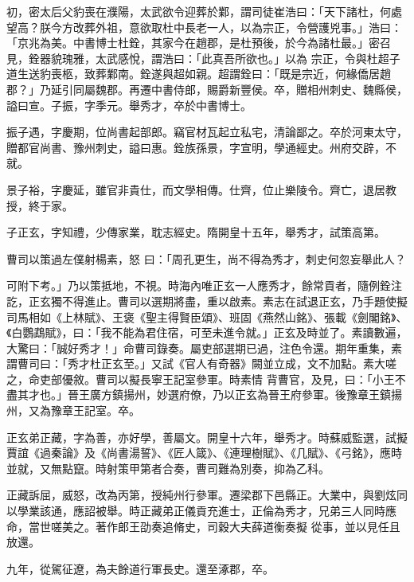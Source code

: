 \begin{pinyinscope}
 初，密太后父豹喪在濮陽，太武欲令迎葬於鄴，謂司徒崔浩曰：「天下諸杜，何處望高？朕今方改葬外祖，意欲取杜中長老一人，以為宗正，令營護兇事。」浩曰：「京兆為美。中書博士杜銓，其家今在趙郡，是杜預後，於今為諸杜最。」密召見，銓器貌瑰雅，太武感悅，謂浩曰：「此真吾所欲也。」以為
 宗正，令與杜超子道生送豹喪柩，致葬鄴南。銓遂與超如親。超謂銓曰：「既是宗近，何緣僑居趙郡？」乃延引同屬魏郡。再遷中書侍郎，賜爵新豐侯。卒，贈相州刺史、魏縣侯，謚曰宣。子振，字季元。舉秀才，卒於中書博士。



 振子遇，字慶期，位尚書起部郎。竊官材瓦起立私宅，清論鄙之。卒於河東太守，贈都官尚書、豫州刺史，謚曰惠。銓族孫景，字宣明，學通經史。州府交辟，不就。



 景子裕，字慶延，雖官非貴仕，而文學相傳。仕齊，位止樂陵令。齊亡，退居教授，終于家。



 子正玄，字知禮，少傳家業，耽志經史。隋開皇十五年，舉秀才，試策高第。



 曹司以策過左僕射楊素，怒
 曰：「周孔更生，尚不得為秀才，刺史何忽妄舉此人？



 可附下考。」乃以策抵地，不視。時海內唯正玄一人應秀才，餘常貢者，隨例銓注訖，正玄獨不得進止。曹司以選期將盡，重以啟素。素志在試退正玄，乃手題使擬司馬相如《上林賦》、王褒《聖主得賢臣頌》、班固《燕然山銘》、張載《劍閣銘》、《白鸚鵡賦》，曰：「我不能為君住宿，可至未進令就。」正玄及時並了。素讀數遍，大驚曰：「誠好秀才！」命曹司錄奏。屬吏部選期已過，注色令還。期年重集，素謂曹司曰：「秀才杜正玄至。」又試《官人有奇器》闕並立成，文不加點。素大嗟之，命吏部優敘。曹司以擬長寧王記室參軍。時素情
 背曹官，及見，曰：「小王不盡其才也。」晉王廣方鎮揚州，妙選府僚，乃以正玄為晉王府參軍。後豫章王鎮揚州，又為豫章王記室。卒。



 正玄弟正藏，字為善，亦好學，善屬文。開皇十六年，舉秀才。時蘇威監選，試擬賈誼《過秦論》及《尚書湯誓》、《匠人箴》、《連理樹賦》、《几賦》、《弓銘》，應時並就，又無點竄。時射策甲第者合奏，曹司難為別奏，抑為乙科。



 正藏訴屈，威怒，改為丙第，授純州行參軍。遷梁郡下邑縣正。大業中，與劉炫同以學業該通，應詔被舉。時正藏弟正儀貢充進士，正倫為秀才，兄弟三人同時應命，當世嗟美之。著作郎王劭奏追脩史，司穀大夫薛道衡奏擬
 從事，並以見任且放還。



 九年，從駕征遼，為夫餘道行軍長史。還至涿郡，卒。




\end{pinyinscope}
